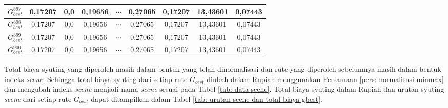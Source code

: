 {{{\begin{tabularx}{\textwidth}{|c|cccccc|c|c|}
    $G_{best}^{897}$ & \multicolumn{1}{c|}{0,17207}                    & \multicolumn{1}{c|}{0,0}      & \multicolumn{1}{c|}{0,19656}  & \multicolumn{1}{c|}{$\cdots$} & \multicolumn{1}{c|}{0,27065}  & 0,17207  & 13,43601 & 0,07443  \\ \hline
    $G_{best}^{898}$ & \multicolumn{1}{c|}{0,17207}                    & \multicolumn{1}{c|}{0,0}      & \multicolumn{1}{c|}{0,19656}  & \multicolumn{1}{c|}{$\cdots$} & \multicolumn{1}{c|}{0,27065}  & 0,17207  & 13,43601 & 0,07443  \\ \hline
    $G_{best}^{899}$ & \multicolumn{1}{c|}{0,17207}                    & \multicolumn{1}{c|}{0,0}      & \multicolumn{1}{c|}{0,19656}  & \multicolumn{1}{c|}{$\cdots$} & \multicolumn{1}{c|}{0,27065}  & 0,17207  & 13,43601 & 0,07443  \\ \hline
    $G_{best}^{900}$ & \multicolumn{1}{c|}{0,17207}                    & \multicolumn{1}{c|}{0,0}      & \multicolumn{1}{c|}{0,19656}  & \multicolumn{1}{c|}{$\cdots$} & \multicolumn{1}{c|}{0,27065}  & 0,17207  & 13,43601 & 0,07443  \\ \hline
\end{tabularx}
}

Total biaya syuting yang diperoleh masih dalam bentuk yang telah dinormalisasi dan rute yang diperoleh sebelumnya masih dalam bentuk indeks \textit{scene}.
Sehingga total biaya syuting dari setiap rute $G_{best}$ diubah dalam Rupiah menggunakan Persamaan \ref{pers: normalisasi minmax} dan mengubah indeks \textit{scene} menjadi nama \textit{scene} sesuai pada Tabel \ref{tab: data scene}.
Total biaya syuting dalam Rupiah dan urutan syuting \textit{scene}  dari setiap rute $G_{best}$ dapat ditampilkan dalam Tabel \ref{tab: urutan scene dan total biaya gbest}.

}}
